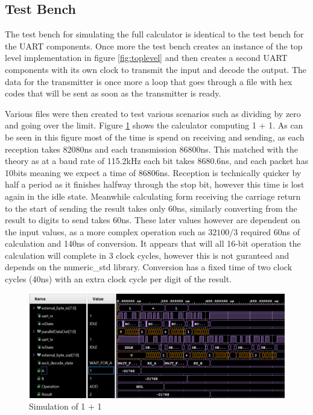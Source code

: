 \documentclass[11pt]{article}
\begin{document}
\subsection{Test Bench}

The test bench for simulating the full calculator is identical to the test bench for the UART components.
Once more the test bench creates an instance of the top level implementation in figure \ref{fig:toplevel}
and then creates a second UART components with its own clock to transmit the input and decode the output.
The data for the transmitter is once more a loop that goes through a file with hex codes that will be sent as soon as the transmitter is ready.

Various files were then created to test various scenarios such as dividing by zero and going over the limit.
Figure \ref{fig:sim} shows the calculator computing 1 + 1.
As can be seen in this figure most of the time is spend on receiving and sending, as each reception takes 82080ns and each transmission 86800ns.
This matched with the theory as at a baud rate of 115.2kHz each bit takes 8680.6ns, and each packet has 10bits meaning we expect a time of 86806ns.
Reception is technically quicker by half a period as it finishes halfway through the stop bit, however this time is lost again in the idle state.
Meanwhile calculating form receiving the carriage return to the start of sending the result takes only 60ns, similarly converting from the result to digits to send takes 60ns.
These later values however are dependent on the input values, as a more complex operation such as $32100/3$ required 60ns of calculation and 140ns of conversion.
It appears that will all 16-bit operation the calculation will complete in 3 clock cycles, however this is not guranteed and depends on the numeric\_std library. 
Conversion has a fixed time of two clock cycles (40ns) with an extra clock cycle per digit of the result.

\begin{figure}[H]        
    \centering
    \includegraphics[width=\textwidth]{Sim1+1.png}
    \caption{Simulation of 1 + 1}
    \label{fig:sim}
\end{figure} 
\end{document}
